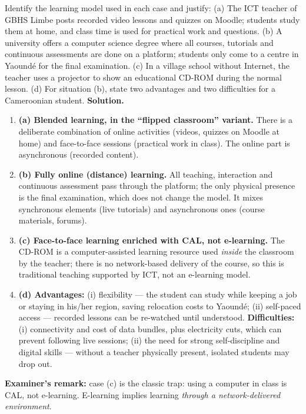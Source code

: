 \documentclass[11pt]{article}
\begin{document}
\begin{exoresolu}
Identify the learning model used in each case and justify: (a) The ICT teacher of GBHS Limbe posts recorded video lessons and quizzes on Moodle; students study them at home, and class time is used for practical work and questions. (b) A university offers a computer science degree where all courses, tutorials and continuous assessments are done on a platform; students only come to a centre in Yaoundé for the final examination. (c) In a village school without Internet, the teacher uses a projector to show an educational CD-ROM during the normal lesson. (d) For situation (b), state two advantages and two difficulties for a Cameroonian student.
\tcblower
\textbf{Solution.}
\begin{enumerate}
\item \textbf{(a) Blended learning, in the ``flipped classroom'' variant.} There is a deliberate combination of online activities (videos, quizzes on Moodle at home) and face-to-face sessions (practical work in class). The online part is asynchronous (recorded content).
\item \textbf{(b) Fully online (distance) learning.} All teaching, interaction and continuous assessment pass through the platform; the only physical presence is the final examination, which does not change the model. It mixes synchronous elements (live tutorials) and asynchronous ones (course materials, forums).
\item \textbf{(c) Face-to-face learning enriched with CAL, not e-learning.} The CD-ROM is a computer-assisted learning resource used \emph{inside} the classroom by the teacher; there is no network-based delivery of the course, so this is traditional teaching supported by ICT, not an e-learning model.
\item \textbf{(d) Advantages:} (i) flexibility — the student can study while keeping a job or staying in his/her region, saving relocation costs to Yaoundé; (ii) self-paced access — recorded lessons can be re-watched until understood. \textbf{Difficulties:} (i) connectivity and cost of data bundles, plus electricity cuts, which can prevent following live sessions; (ii) the need for strong self-discipline and digital skills — without a teacher physically present, isolated students may drop out.
\end{enumerate}
\textbf{Examiner's remark:} case (c) is the classic trap: using a computer in class is CAL, not e-learning. E-learning implies learning \emph{through a network-delivered environment}.
\end{exoresolu}
\end{document}
